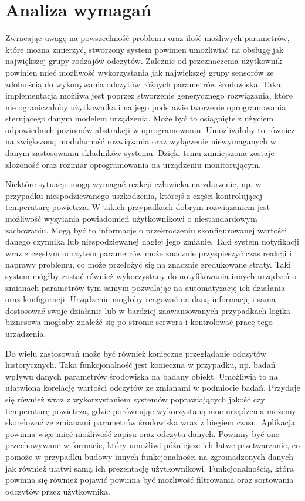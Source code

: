 \chapter{Analiza wymagań}

Zwracając uwagę na powszechność problemu oraz ilość możliwych parametrów,
które można zmierzyć, stworzony system powinien umożliwiać na obsługę jak 
największej grupy rodzajów odczytów. Zależnie od przeznaczenia użytkownik
powinien mieć możliwość wykorzystania jak największej grupy sensorów ze
zdolnością do wykonywania odczytów różnych parametrów środowiska.
Taka implementacja możliwa jest poprzez stworzenie generycznego rozwiązania, które
nie ograniczałoby użytkownika i na jego podstawie tworzenie oprogramowania
sterującego danym modelem urządzenia.
Może być to osiągnięte z użyciem odpowiednich poziomów abstrakcji w oprogramowaniu.
Umożliwiłoby to również na zwiększoną modularność rozwiązania oraz
wyłączenie niewymaganych w danym zastosowaniu składników systemu.
Dzięki temu zmniejszona zostaje złożoność oraz rozmiar oprogramowania
na urządzeniu monitorującym.

Niektóre sytuacje mogą wymagać reakcji człowieka na zdarzenie, np.
w przypadku niespodziewanego uszkodzenia, którejś z części kontrolującej
temperaturę powietrza. W takich przypadkach dobrym rozwiązaniem jest możliwość
wysyłania powiadomień użytkownikowi o niestandardowym zachowaniu.
Mogą być to informacje o przekroczeniu skonfigurowanej wartości danego czynnika
lub niespodziewanej nagłej jego zmianie. Taki system notyfikacji wraz z
częstym odczytem parametrów może znacznie przyśpieszyć czas reakcji
i naprawy problemu, co może przełożyć się na znacznie zredukowane straty.
Taki system mógłby zostać również wykorzystany do notyfikowania innych
urządzeń o zmianach parametrów tym samym pozwalając na automatyzację
ich działania oraz konfiguracji. Urządzenie mogłoby reagować na daną 
informację i sama dostosować swoje działanie lub w bardziej zaawansowanych
przypadkach logika biznesowa mogłaby znaleźć się po stronie serwera i 
kontrolować pracę tego urządzenia.

Do wielu zastosowań może być również konieczne przeglądanie odczytów historycznych.
Taka funkcjonalność jest konieczna w przypadku, np. badań wpływu danych
parametrów środowiska na badany obiekt. Umożliwia to na ułatwioną korelację
wartości odczytów ze zmianami w podmiocie badań. Przydaje się również 
wraz z wykorzystaniem systemów poprawiających jakość czy temperaturę
powietrza, gdzie porównując wykorzystaną moc urządzenia możemy skorelować
ze zmianami parametrów środowiska wraz z biegiem czasu.
Aplikacja powinna więc mieć możliwość zapisu oraz odczytu danych. Powinny być
one przechowywane w formacie, który umożliwi późniejsze ich łatwe przetwarzanie,
co pomoże w przypadku budowy innych funkcjonalności na zgromadzonych danych
jak również ułatwi samą ich prezentację użytkownikowi. Funkcjonalnością, która
powinna się również pojawić powinna być możliwość filtrowania oraz sortowania
odczytów przez użytkownika.

